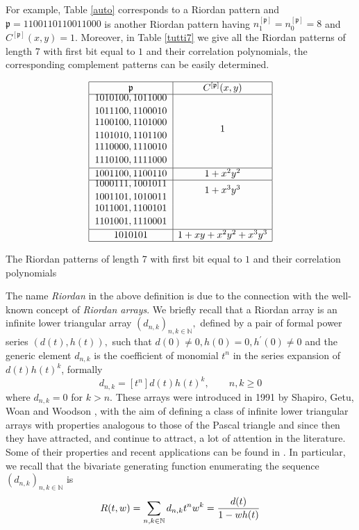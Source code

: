 For example, Table \ref{auto} corresponds to a Riordan pattern and $\mathfrak{p}= 1100110110011000$ is another Riordan pattern having
$n_1^{[\mathfrak{p}]}=n_0^{[\mathfrak{p}]}=8$ and
$C^{[\mathfrak{p}]}(x,y)=1.$ Moreover, in Table \ref{tutti7} we give all the Riordan  patterns of length 7 with first bit equal to $1$ and their correlation polynomials,
the corresponding complement patterns can be easily determined.



\begin{table}
$$
{\displaystyle
\begin{array}{|c|c|}
  \hline
  \mathfrak{p} & C^{[\mathfrak{p}]}(x,y)\\
  \hline
{\displaystyle {1010100, 1011000 \atop 1011100, 1100010}} & \\  [0.3cm]
{\displaystyle {1100100, 1101000 \atop 1101010, 1101100}} &  1\\  [0.3cm]
{\displaystyle {1110000, 1110010 \atop 1110100, 1111000}} & \\  [0.3cm] \hline
1001100, 1100110 &  1+x^2y^2 \\ \hline
{\displaystyle {1000111, 1001011 \atop 1001101, 1010011 }} & 1+x^3y^3 \\  [0.3cm]
{\displaystyle {1011001, 1100101 \atop 1101001, 1110001}} &  \\  [0.3cm] \hline
1010101 &  1+xy+x^2y^2+x^3y^3 \\ \hline
\end{array}
}
$$
\caption{\label{tutti7}The Riordan patterns of length 7 with first bit equal to $1$ and their correlation polynomials}
\end{table}



The name \textit{Riordan} in the above definition is due to the connection with
the well-known concept of \textit{Riordan arrays}.  We briefly recall that a
Riordan array is an infinite lower triangular array  $(d_{n,k} )_{n,k \in
\mathbb{N}},$ defined by a pair of formal power series $(d(t),h(t)),$ such that
$d(0)\neq 0, h(0)=0, h^\prime(0)\neq0$ and the generic element $d_{n,k}$ is the
coefficient of monomial $t^{n}$ in the series expansion of $d(t)h(t)^{k}$, formally
\begin{displaymath}
    d_{n,k}=[t^n]d(t)h(t)^k, \qquad n,k \geq 0
\end{displaymath}
where $d_{n,k}=0$ for $k>n.$ These arrays were introduced in 1991 by Shapiro,
Getu, Woan and Woodson \cite{SGWW91}, with the aim of defining a class of
infinite lower triangular arrays with properties analogous to those of the
Pascal triangle and since then they have attracted, and continue to attract,
a lot of attention in the literature. Some of their properties  and recent
applications can be found in \cite{LMMS14,MRSV97}. In particular, we recall
that the bivariate generating function enumerating the sequence
$(d_{n,k} )_{n,k \in\mathbb{N}}$ is
\begin{equation}
    \label{bgf}
    R(t,w) = \sum_{n,k \in\mathbb{N}}{d_{n,k} t^n w^k} = {d(t) \over 1-wh(t)}
\end{equation}

